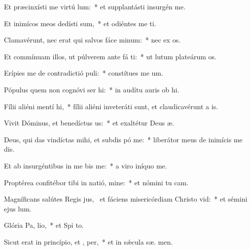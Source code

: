 \item Et præcinxísti me virtú  lum:~* et supplantásti insurgén    me.
\item Et inimícos meos dedísti  sum,~* et odiéntes me ti.
\item Clamavérunt, nec erat qui salvos fáce  minum:~* nec ex os.
\item Et commínuam illos, ut púlverem ante fá ti:~* ut lutum plateárum  os.
\item Erípies me de contradictió puli:~* constítues me   um.
\item Pópulus quem non cognóvi ser hi:~* in audítu auris ob hi.
\item Fílii aliéni mentí  hi,~* fílii aliéni inveteráti sunt, et claudicavérunt a  is.
\item Vivit Dóminus, et benedíctus  us:~* et exaltétur Deus  æ.
\item Deus, qui das vindíctas mihi, et subdis pó  me:~* liberátor meus de inimícis me dis.
\item Et ab insurgéntibus in me bis me:~* a viro iníquo  me.
\item Proptérea confitébor tibi in natió, mine:~* et nómini tu  cam.
\item Magníficans salútes Regis jus,~\pscross{} et fáciens misericórdiam Christo  vid:~* et sémini ejus   lum.
\item Glória Pa,  lio,~* et Spi to.
\item Sicut erat in princípio, et ,  per,~* et in sǽcula sæ. men.
